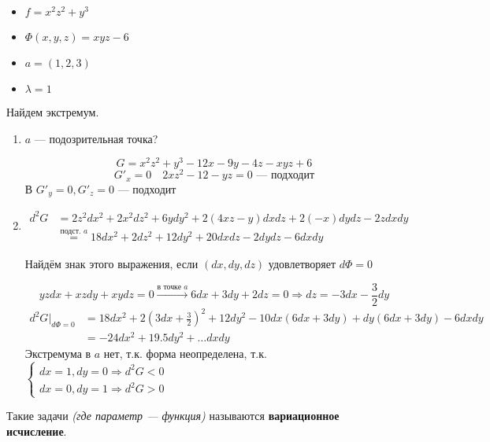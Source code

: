 \begin{example}\itemfix
    \begin{itemize}
        \item $f = x^2z^2 + y^3$
        \item $\Phi(x, y, z) = xyz - 6$
        \item $a = (1, 2, 3)$
        \item $\lambda = 1$
    \end{itemize}
    Найдем экстремум.

    \begin{enumerate}
        \item $a$ --- подозрительная точка?

              $$G = x^2z^2 + y^3 - 12x - 9y - 4z - xyz + 6$$
              $$G'_x = 0 \quad 2xz^2 - 12 - yz = 0 \text{ --- подходит}$$
              В $G'_y = 0, G'_z = 0$ --- подходит

        \item \begin{align*}
                  d^2 G & = 2z^2 dx^2 + 2x^2 dz^2 + 6ydy^2 + 2(4xz - y)dxdz + 2(-x)dydz - 2zdxdy          \\
                        & \stackrel{\text{подст. } a}{=} 18dx^2 + 2dz^2 + 12dy^2 + 20dxdz - 2dydz - 6dxdy
              \end{align*}

              Найдём знак этого выражения, если $(dx, dy, dz)$ удовлетворяет $d\Phi=0$

              $$yz dx + xz dy + xy dz = 0 \xrightarrow{\text{в точке } a} 6dx + 3dy + 2dz = 0 \Rightarrow dz = -3dx - \frac{3}{2}dy$$
              \begin{align*}
                  d^2G\Big|_{d\Phi=0} & = 18dx^2 + 2\left(3dx + \frac{3}{2}\right)^2 + 12dy^2 - 10dx(6dx + 3dy) + dy(6dx + 3dy) - 6dxdy \\
                                      & = -24 dx^2 + 19.5dy^2 + \ldots dxdy
              \end{align*}
              Экстремума в $a$ нет, т.к. форма неопределена, т.к. $\begin{cases}
                      dx = 1, dy = 0 \Rightarrow d^2G<0 \\
                      dx = 0, dy = 1 \Rightarrow d^2G>0
                  \end{cases}$
    \end{enumerate}
\end{example}

Такие задачи \textit{(где параметр --- функция)} называются \textbf{вариационное исчисление}.

